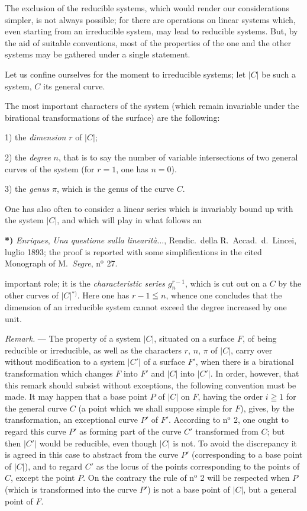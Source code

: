 \documentclass{article}
\begin{document}
The exclusion of the reducible systems, which would render our considerations simpler, is not always possible; for there are operations on linear systems which, even starting from an irreducible system, may lead to reducible systems. But, by the aid of suitable conventions, most of the properties of the one and the other systems may be gathered under a single statement.

Let us confine ourselves for the moment to irreducible systems; let $|C|$ be such a system, $C$ its general curve.

The most important characters of the system (which remain invariable under the birational transformations of the surface) are the following:

1) the \emph{dimension} $r$ of $|C|$;

2) the \emph{degree} $n$, that is to say the number of variable intersections of two general curves of the system (for $r = 1$, one has $n = 0$).

3) the \emph{genus} $\pi$, which is the genus of the curve $C$.

One has also often to consider a linear series which is invariably bound up with the system $|C|$, and which will play in what follows an

\textbf{*)} \emph{Enriques}, \emph{Una questione sulla linearità}..., Rendic.\ della R.\ Accad.\ d.\ Lincei, luglio 1893; the proof is reported with some simplifications in the cited Monograph of M.\ \emph{Segre}, n${}^{\text{o}}$ 27.

important role; it is the \emph{characteristic series $g_{n}^{r-1}$}, which is cut out on a $C$ by the other curves of $|C|$${}^{*)}$. Here one has $r - 1 \leqq n$, whence one concludes that the dimension of an irreducible system cannot exceed the degree increased by one unit.

\emph{Remark.} --- The property of a system $|C|$, situated on a surface $F$, of being reducible or irreducible, as well as the characters $r$, $n$, $\pi$ of $|C|$, carry over without modification to a system $|C'|$ of a surface $F'$, when there is a birational transformation which changes $F$ into $F'$ and $|C|$ into $|C'|$. In order, however, that this remark should subsist without exceptions, the following convention must be made. It may happen that a base point $P$ of $|C|$ on $F$, having the order $i \geqq 1$ for the general curve $C$ (a point which we shall suppose simple for $F$), gives, by the transformation, an exceptional curve $P'$ of $F'$. According to n${}^{\text{o}}$ 2, one ought to regard this curve $P'$ as forming part of the curve $C'$ transformed from $C$; but then $|C'|$ would be reducible, even though $|C|$ is not. To avoid the discrepancy it is agreed in this case to abstract from the curve $P'$ (corresponding to a base point of $|C|$), and to regard $C'$ as the locus of the points corresponding to the points of $C$, except the point $P$. On the contrary the rule of n${}^{\text{o}}$ 2 will be respected when $P$ (which is transformed into the curve $P'$) is not a base point of $|C|$, but a general point of $F$.
\end{document}
